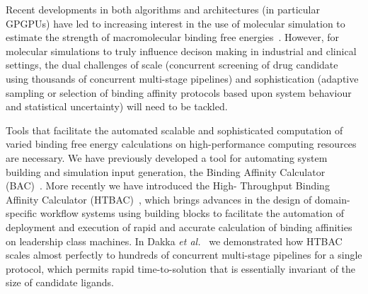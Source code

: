 Recent developments in both algorithms and architectures (in particular
GPGPUs) have led to increasing interest in the use of molecular simulation to
estimate the strength of macromolecular binding free
energies~\cite{DeVivo2016}. However, for molecular simulations to truly
influence decison making in industrial and clinical settings, the dual
challenges of scale (concurrent screening of drug candidate using thousands of
concurrent multi-stage pipelines) and sophistication (adaptive sampling or
selection of binding affinity protocols based upon system behaviour and
statistical uncertainty) will need to be tackled.


Tools that facilitate the automated scalable and sophisticated computation of
varied binding free energy calculations on high-performance computing
resources are necessary. We have previously developed a tool for automating
system building and simulation input generation, the Binding Affinity
Calculator (BAC)~\cite{Sadiq2008}. More recently we have introduced the High-
Throughput Binding Affinity Calculator (HTBAC)~\cite{dakka2017}, which brings
advances in the design of domain-specific workflow systems using building
blocks to facilitate the automation of deployment and execution of rapid and
accurate calculation of binding affinities on leadership class machines. In
Dakka \textit{et al.}~\cite{dakka2017} we demonstrated how HTBAC scales almost
perfectly to hundreds of concurrent multi-stage pipelines for a single
protocol, which permits rapid time-to-solution that is essentially invariant
of the size of candidate ligands.


